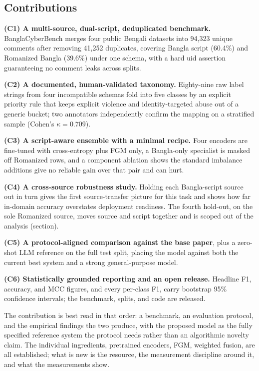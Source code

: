 \documentclass[11pt,a4paper]{article}
\def\cref#1{section}%
\def\texttt#1{#1}%
\newcommand{\bench}{BanglaCyberBench}
\begin{document}
\subsection{Contributions}
\label{sec:contributions}

\textbf{(C1) A multi-source, dual-script, deduplicated benchmark.} \bench{} merges four public Bengali datasets into 94{,}323 unique comments after removing 41{,}252 duplicates, covering Bangla script (60.4\%) and Romanized Bangla (39.6\%) under one schema, with a hard \texttt{uid} assertion guaranteeing no comment leaks across splits.

\textbf{(C2) A documented, human-validated taxonomy.} Eighty-nine raw label strings from four incompatible schemas fold into five classes by an explicit priority rule that keeps explicit violence and identity-targeted abuse out of a generic bucket; two annotators independently confirm the mapping on a stratified sample (Cohen's $\kappa = 0.709$).

\textbf{(C3) A script-aware ensemble with a minimal recipe.} Four encoders are fine-tuned with cross-entropy plus FGM only, a Bangla-only specialist is masked off Romanized rows, and a component ablation shows the standard imbalance additions give no reliable gain over that pair and can hurt.

\textbf{(C4) A cross-source robustness study.} Holding each Bangla-script source out in turn gives the first source-transfer picture for this task and shows how far in-domain accuracy overstates deployment readiness. The fourth hold-out, on the sole Romanized source, moves source and script together and is scoped out of the analysis (\cref{sec:splits}).

\textbf{(C5) A protocol-aligned comparison against the base paper}, plus a zero-shot LLM reference on the full test split, placing the model against both the current best system and a strong general-purpose model.

\textbf{(C6) Statistically grounded reporting and an open release.} Headline F1, accuracy, and MCC figures, and every per-class F1, carry bootstrap 95\% confidence intervals; the benchmark, splits, and code are released.

The contribution is best read in that order: a benchmark, an evaluation protocol, and the empirical findings the two produce, with the proposed model as the fully specified reference system the protocol needs rather than an algorithmic novelty claim. The individual ingredients, pretrained encoders, FGM, weighted fusion, are all established; what is new is the resource, the measurement discipline around it, and what the measurements show.
\end{document}
